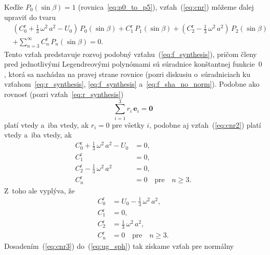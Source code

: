 \documentclass[a4paper, 12pt]{book}
\let\vec\mathbf
\begin{document}
Keďže $P_0(\sin\beta) = 1$ (rovnica~\ref{eq:p0_to_p5}), vzťah~(\ref{eq:cnr}) 
môžeme ďalej upraviť do tvaru
%
\begin{equation}
\label{eq:cnr2}
\begin{split}
&\left( C_0^\mathrm{r} + \frac{1}{3} \, \omega^2 \, a^2 - U_0 \right) \, 
P_0(\sin\beta) + C_1^\mathrm{r} \, P_1(\sin\beta) + \left(C_2^\mathrm{r} 
- \frac{1}{3} \, \omega^2 \, a^2 \right) \, P_2(\sin\beta)\\
%
&+ \sum_{n = 3}^\infty C^{\mathrm{r}}_n \, P_n(\sin\beta) = 0{.}
\end{split}
\end{equation}
%
Tento vzťah predstavuje rozvoj podobný vzťahu~(\ref{eq:f_synthesis}), pričom 
členy pred jednotlivými Legendreovými polynómami sú súradnice konštantnej 
funkcie~$0$, ktorá sa nachádza na pravej strane rovnice (pozri diskusiu 
o~súradniciach ku vzťahom~\ref{eq:r_synthesis}, \ref{eq:f_synthesis} 
a~\ref{eq:f_sha_no_norm}).  Podobne ako rovnosť (pozri 
vzťah~\ref{eq:r_synthesis})
%
\begin{equation}
\sum_{i = 1}^3 r_i \, \vec{e}_i = \vec{0}
\end{equation}
%
platí vtedy a~iba vtedy, ak $r_i = 0$ pre všetky $i$, podobne aj 
vzťah~(\ref{eq:cnr2}) platí vtedy a~iba vtedy, ak
%
\begin{equation}
\begin{split}
C_0^\mathrm{r} + \frac{1}{3} \, \omega^2 \, a^2 - U_0 &= 0{,}\\
C_1^\mathrm{r}                                        &= 0{,}\\
C_2^\mathrm{r} - \frac{1}{3} \, \omega^2 \, a^2       &= 0{,}\\
C_n^\mathrm{r}                                        &= 0 \quad \textrm{pre} 
\quad n \geq 3{.}
\end{split}
\end{equation}
%
Z~toho ale vyplýva, že
%
\begin{equation}
\label{eq:cnr3}
\begin{split}
C_0^\mathrm{r} &= U_0 - \frac{1}{3} \, \omega^2 \, a^2{,}\\
C_1^\mathrm{r} &= 0{,}\\
C_2^\mathrm{r} &= \frac{1}{3} \, \omega^2 \, a^2{,}\\
C_n^\mathrm{r} &= 0 \quad \textrm{pre} \quad n \geq 3{.}
\end{split}
\end{equation}
%
Dosadením~(\ref{eq:cnr3}) do~(\ref{eq:ug_sph}) tak získame vzťah pre normálny 
\end{document}
